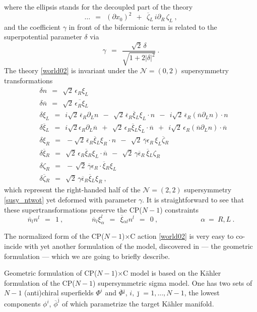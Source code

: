 \documentclass[12pt]{article}
\newcommand{\ntwot}{${\mathcal N}= \left(2,2\right) $ }
\newcommand{\ntwoo}{${\mathcal N}= \left(0,2\right) $ }
\newcommand{\p}{\partial}
\newcommand{\ov}{\overline}
\newcommand{\bxir}{\ov{\xi}{}_R}
\newcommand{\bxil}{\ov{\xi}{}_L}
\newcommand{\xir}{\xi_R}
\newcommand{\xil}{\xi_L}
\newcommand{\bzl}{\ov{\zeta}{}_L}
\newcommand{\bzr}{\ov{\zeta}{}_R}
\newcommand{\zr}{\zeta_R}
\newcommand{\zl}{\zeta_L}
\newcommand{\CPC}{CP($N-1$)$\times$C }
\begin{document}
	where the ellipsis stands for the decoupled part of the theory
\[
	\dots ~~=~~ \left(\p x_0\right)^2 ~~+~~ \bzl\, i\p_R\, \zl ~,
\]
	and the coefficient $ \gamma $ in front of the bifermionic term is related to the superpotential parameter $ \delta $ via
\[
	\gamma ~~=~~ \frac { \sqrt{2}\,\delta } { \sqrt{ 1 +  2 |\delta|^2 } }~.
\]
	The theory \eqref{world02} is invariant under the \ntwoo supersymmetry transformations
\begin{align*}
%
	&
	\delta n ~~=~~ \sqrt{2}\, \epsilon_R \xil  \\
%
	&
	 \delta\ov{n} ~~=~~ \sqrt{2}\, \ov{\epsilon_R \xi}{}_L
	\\
%
	&
	\delta\xil ~~=~~ i\sqrt{2}\, \ov{\epsilon}{}_R \p_L n ~~-~~ 
			\sqrt{2}\, \ov{\epsilon}{}_R \bxil\xil \cdot n ~~-~~
			i\sqrt{2}\, \ov{\epsilon}{}_R \left( \ov{n}\p_L n \right) \cdot n \\
%
	&
	\delta\bxil ~~=~~ i\sqrt{2}\epsilon_R \p_L \ov{n}  ~~+~~
			\sqrt{2}\,\epsilon_R \bxil\xil \cdot \ov{n} ~~+~~
			i\sqrt{2}\, \epsilon_R \left( \ov{n} \p_L n \right) \cdot \ov{n} \\
%
	& 
	\delta\xir ~~=~~ - \sqrt{2}\, \ov{\epsilon}{}_R \bxil\xir \cdot n 
		~~-~~ \sqrt{2}\, \ov{\gamma}\epsilon_R\, \xil \bzr \\
%
	&
	\delta\bxir  ~~=~~ \sqrt{2}\, \epsilon_R \bxir \xil \cdot \ov{n} 
		~~-~~ \sqrt{2}\, \gamma\ov{\epsilon}{}_R\, \bxil\zr \\
%
	&
	\delta\zeta_R ~~=~~ -\, \sqrt{2}\, \ov{\gamma}\epsilon_R \cdot \bxir\xil \\
%
	&
	\delta\ov{\zeta}{}_R ~~=~~ \sqrt{2}\, \gamma \ov{\epsilon}{}_R \bxil\xir~,
\end{align*}
	which represent the right-handed half of the \ntwot supersymmetry \eqref{susy_ntwot} yet
	deformed with parameter $ \gamma $.
	It is straightforward to see that these supertransformations preserve the CP($N-1$) constraints
\[
	\ov{n}{}_l n^l ~~=~~ 1~, \qquad\qquad  \ov{n}{}_l\xi_\alpha^l ~~=~~ \ov{\xi}{}_{\alpha l} n^l ~~=~~ 0~,
		\qquad\qquad\qquad  \alpha ~=~ R,L~.
\]

	The normalized form of the \CPC action \eqref{world02} is very easy to co-incide with yet another
	formulation of the model, discovered in \cite{SYhet} --- the geometric formulation --- which we are going
	to briefly describe.

\newcommand{\bi}{{\bar \imath}}
\newcommand{\bj}{{\bar \jmath}}
\newcommand{\bk}{{\bar k}}
\newcommand{\bl}{{\bar l}}
\newcommand{\bm}{{\bar m}}
	Geometric formulation of \CPC model is based on the K\"{a}hler formulation of the CP($N-1$) supersymmetric
	sigma model.
	One has two sets of $ N - 1 $ (anti)chiral superfields $ \Phi^i $ and $ \ov{\Phi}{}^\bj $, 
	$ i, \bj = 1,..., N-1 $, the lowest components $ \phi^i $, $ \ov{\phi}^\bj $ of which parametrize the target K\"{a}hler
	manifold.
\end{document}
